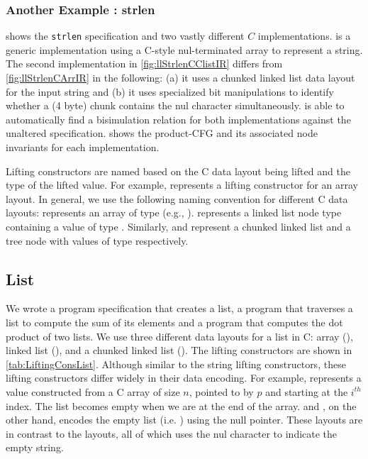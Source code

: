 \subsubsection{Another Example : strlen}
 shows the {\tt strlen} specification and two vastly
different $C$ implementations.  is a generic implementation
using a C-style nul-terminated array to represent a string.
The second implementation in \cref{fig:llStrlenCClistIR} differs from \cref{fig:llStrlenCArrIR}
in the following: (a) it uses a chunked linked list data layout for the input string
and (b) it uses specialized bit manipulations to identify whether a (4 byte) chunk contains the nul character simultaneously.
\toolName{} is able to automatically find a bisimulation relation
for both implementations against the unaltered specification.
 shows the product-CFG and its associated node invariants for each implementation.


Lifting constructors are named based on the C data layout being lifted
and the type of the lifted value.
For example,  represents a  lifting constructor
for an array layout.
In general, we use the following naming convention for different C data layouts:
 represents an array of type  (e.g., ).
 represents a linked list node type containing a value of type .
Similarly,  and  represent a chunked linked list and a tree node
with values of type  respectively.

\subsection{List}
\label{sec:explist}
We wrote a \SpecL{} program specification that creates a list, a
program that traverses a list to compute the sum of its elements and a program
that computes the dot product of two lists. We use three different
data layouts for a list in C: array (),
linked list (), and
a chunked linked list ().
The lifting constructors are shown in \cref{tab:LiftingConsList}.
Although similar to the string lifting constructors, these lifting
constructors differ widely in their data encoding. For example,
 represents a  value constructed
from a C array of size $n$, pointed to by $p$ and starting at the $i^{th}$ index.
The list becomes empty when we are at the end of the array.
 and , on the other hand, encodes the
empty list (i.e. ) using the null pointer.
These layouts are in contrast to the  layouts, all of which uses the nul character
to indicate the empty string.


